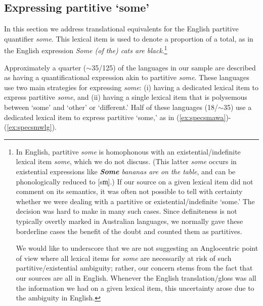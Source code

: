 \documentclass[12pt,egregdoesnotlikesansseriftitles]{scrartcl}
\begin{document}
\subsection{Expressing partitive `some'}
\label{sec:some}
In this section we address translational equivalents for the English partitive quantifier \textit{some}. This lexical item is used to denote a proportion of a total, as in the English expression \textit{Some (of the) cats are black}.\footnote{In English, partitive \textit{some} is homophonous with an existential/indefinite lexical item \textit{some}, which we do not discuss. (This latter \textit{some} occurs in existential expressions like \textit{\textbf{Some} bananas are on the table}, and can be phonologically reduced to [{\charis sm̩]}.) If our source on a given lexical item did not comment on its semantics, it was often not possible to tell with certainty whether we were dealing with a partitive or existential/indefinite `some.' The decision was hard to make in many such cases. Since definiteness is not typically overtly marked in Australian languages, we normally gave these borderline cases the benefit of the doubt and counted them as partitives. %



We would  like to underscore that we are not suggesting an Anglocentric point of view where all lexical items for \textit{some} are necessarily at risk of such partitive/existential ambiguity; rather, our concern stems from the fact that our sources are all in English. Whenever the English translation/gloss was all the information we had on a given lexical item, this uncertainty arose due to the ambiguity in English.} %

Approximately a quarter ($\sim$35/125) of the languages in our sample are described as having a quantificational expression akin to partitive \textit{some}. These languages use two main strategies for expressing \textit{some}: (i) having a dedicated lexical item to express partitive \textit{some}, and (ii) having a single lexical item that is polysemous between `some' and `other' or `different.' Half of these languages (18/$\sim$35) use a dedicated lexical item to express partitive `some,' as in (\ref{ex:specsmawa})-(\ref{ex:specsmwlg}).
\end{document}
